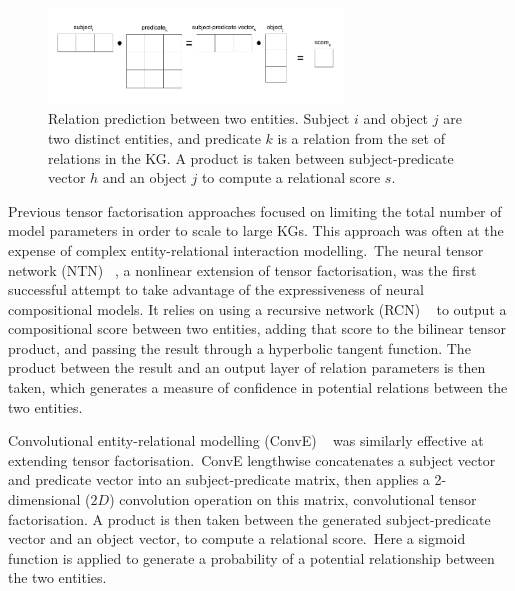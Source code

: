 \begin{figure}[H]
   	\centering
    	\includegraphics[width=0.7\textwidth, height=0.3\textwidth]{inference}
	\captionsetup{justification=centering}
	\caption{Relation prediction between two entities. Subject $ i $ and object $ j $ are two distinct entities, and predicate $ k $ is a relation from the set of relations in the KG. A product is taken between subject-predicate vector $ h $ and an object $ j $ to compute a relational score $ s $.}
\end{figure}

\noindent Previous tensor factorisation approaches focused on limiting the total number of model parameters in order to scale to large KGs. This approach was often at the expense of complex entity-relational interaction modelling.\ The neural tensor network (NTN) \unskip~\citep{socher2013reasoning}, a nonlinear extension of tensor factorisation, was the first successful attempt to take advantage of the expressiveness of neural compositional models. It relies on using a recursive network (RCN) \unskip ~\citep{pollack1990recursive} to output a compositional score between two entities, adding that score to the bilinear tensor product, and passing the result through a hyperbolic tangent function. The product between the result and an output layer of relation parameters is then taken, which generates a measure of confidence in potential relations between the two entities.\par

\noindent Convolutional entity-relational modelling (ConvE) \unskip~\citep{dettmers2018convolutional} was similarly effective at extending tensor factorisation.\ ConvE lengthwise concatenates a subject vector and predicate vector into an subject-predicate matrix, then applies a 2-dimensional ($ 2D $) convolution operation on this matrix, convolutional tensor factorisation. A product is then taken between the generated subject-predicate vector and an object vector, to compute a relational score.\ Here a sigmoid function is applied to generate a probability of a potential relationship between the two entities. \par 

